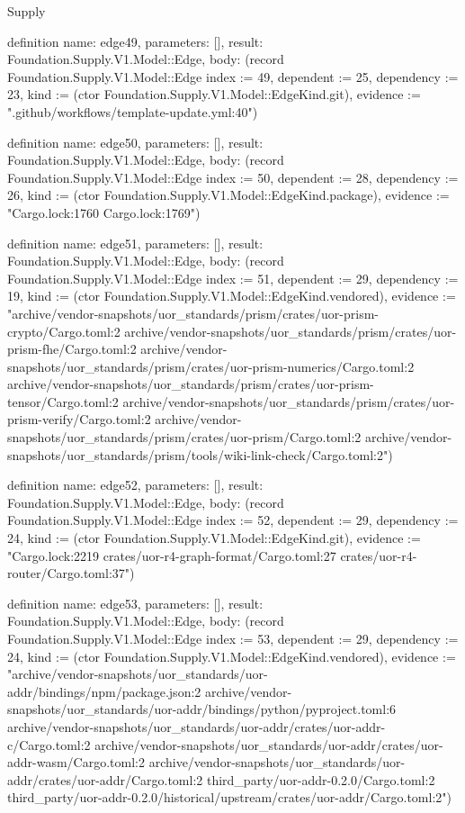 \begin{lexlean}{Supply}
\begin{semanticmodule}
definition{
  name: edge49,
  parameters: [],
  result: Foundation.Supply.V1.Model::Edge,
  body: (record Foundation.Supply.V1.Model::Edge {index := 49, dependent := 25, dependency := 23, kind := (ctor Foundation.Supply.V1.Model::EdgeKind.git), evidence := ".github/workflows/template-update.yml:40"})
}

definition{
  name: edge50,
  parameters: [],
  result: Foundation.Supply.V1.Model::Edge,
  body: (record Foundation.Supply.V1.Model::Edge {index := 50, dependent := 28, dependency := 26, kind := (ctor Foundation.Supply.V1.Model::EdgeKind.package), evidence := "Cargo.lock:1760 Cargo.lock:1769"})
}

definition{
  name: edge51,
  parameters: [],
  result: Foundation.Supply.V1.Model::Edge,
  body: (record Foundation.Supply.V1.Model::Edge {index := 51, dependent := 29, dependency := 19, kind := (ctor Foundation.Supply.V1.Model::EdgeKind.vendored), evidence := "archive/vendor-snapshots/uor_standards/prism/crates/uor-prism-crypto/Cargo.toml:2 archive/vendor-snapshots/uor_standards/prism/crates/uor-prism-fhe/Cargo.toml:2 archive/vendor-snapshots/uor_standards/prism/crates/uor-prism-numerics/Cargo.toml:2 archive/vendor-snapshots/uor_standards/prism/crates/uor-prism-tensor/Cargo.toml:2 archive/vendor-snapshots/uor_standards/prism/crates/uor-prism-verify/Cargo.toml:2 archive/vendor-snapshots/uor_standards/prism/crates/uor-prism/Cargo.toml:2 archive/vendor-snapshots/uor_standards/prism/tools/wiki-link-check/Cargo.toml:2"})
}

definition{
  name: edge52,
  parameters: [],
  result: Foundation.Supply.V1.Model::Edge,
  body: (record Foundation.Supply.V1.Model::Edge {index := 52, dependent := 29, dependency := 24, kind := (ctor Foundation.Supply.V1.Model::EdgeKind.git), evidence := "Cargo.lock:2219 crates/uor-r4-graph-format/Cargo.toml:27 crates/uor-r4-router/Cargo.toml:37"})
}

definition{
  name: edge53,
  parameters: [],
  result: Foundation.Supply.V1.Model::Edge,
  body: (record Foundation.Supply.V1.Model::Edge {index := 53, dependent := 29, dependency := 24, kind := (ctor Foundation.Supply.V1.Model::EdgeKind.vendored), evidence := "archive/vendor-snapshots/uor_standards/uor-addr/bindings/npm/package.json:2 archive/vendor-snapshots/uor_standards/uor-addr/bindings/python/pyproject.toml:6 archive/vendor-snapshots/uor_standards/uor-addr/crates/uor-addr-c/Cargo.toml:2 archive/vendor-snapshots/uor_standards/uor-addr/crates/uor-addr-wasm/Cargo.toml:2 archive/vendor-snapshots/uor_standards/uor-addr/crates/uor-addr/Cargo.toml:2 third_party/uor-addr-0.2.0/Cargo.toml:2 third_party/uor-addr-0.2.0/historical/upstream/crates/uor-addr/Cargo.toml:2"})
}


\end{semanticmodule}
\end{lexlean}
